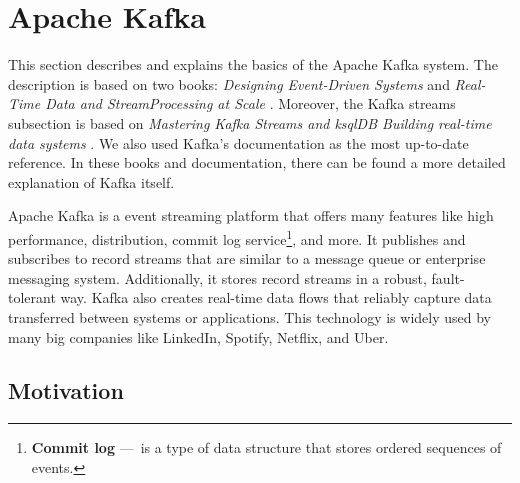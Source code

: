 \section{Apache Kafka}
\label{02:sec:title}

This section describes and explains the basics of the Apache Kafka system. The description is based on two books: \emph{Designing Event-Driven Systems} \cite{apacheKafkaDesignDistributedSystems} and \emph{Real-Time Data and StreamProcessing at Scale} \cite{apacheKafkaDefinitiveGuide}. Moreover, the Kafka streams subsection is based on \emph{Mastering Kafka Streams and ksqlDB Building real-time data systems} \cite{kafkaStreamsBook}. We also used Kafka's documentation \cite{kafkaDocumentation} as the most up-to-date reference. In these books and documentation, there can be found a more detailed explanation of Kafka itself.

Apache Kafka is a event streaming platform that offers many features like high performance, distribution, commit log service\footnote{\textbf{Commit log} 
---\ is a type of data structure that stores ordered sequences of events.}, and more. It publishes and subscribes to record streams that are similar to a message queue or enterprise messaging system. Additionally, it stores record streams in a robust, fault-tolerant way. Kafka also creates real-time data flows that reliably capture data transferred between systems or applications. This technology is widely used by many big companies like LinkedIn, Spotify, Netflix, and Uber.
\subsection{Motivation \cite{02-bachelor-thesis}}
\label{kafka:motivation}

